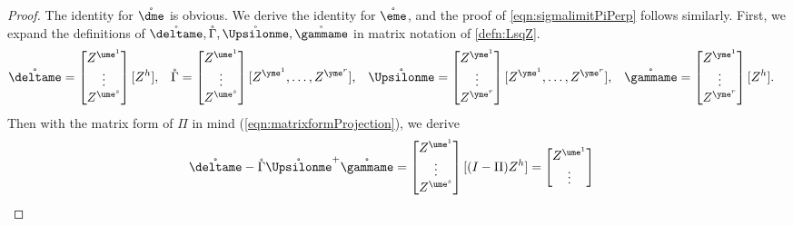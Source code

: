 \documentclass[main.tex]{subfiles}
\begin{document}
  \begin{proof}
    The identity for $\mathring \dme$ is obvious.
    We derive the identity for $\mathring \eme$, and the proof of \cref{eqn:sigmalimitPiPerp} follows similarly.
    First, we expand the definitions of $\mathring \deltame, \mathring\Gamma, \mathring\Upsilonme, \mathring\gammame$ in matrix notation of \cref{defn:LsqZ}.
    \begin{align*}
      \mathring \deltame &= \begin{bmatrix}
              Z^{\ume^1}\\
            \vdots\\
              Z^{\ume^s}
          \end{bmatrix}
          [Z^h]
          ,&
      \mathring \Gamma &=
          \begin{bmatrix}
              Z^{\ume^1}\\
            \vdots\\
              Z^{\ume^s}
          \end{bmatrix}
          [Z^{\yme^1}, \ldots, Z^{\yme^r}]
          ,&
      \mathring \Upsilonme &=
        \begin{bmatrix}
            Z^{\yme^1}\\
          \vdots\\
            Z^{\yme^r}
        \end{bmatrix}
        [Z^{\yme^1}, \ldots, Z^{\yme^r}]
        ,&
      \mathring \gammame &=
        \begin{bmatrix}
            Z^{\yme^1}\\
          \vdots\\
            Z^{\yme^r}
        \end{bmatrix}
        [Z^h]
        .
    \end{align*}
    Then with the matrix form of $\Pi$ in mind (\cref{eqn:matrixformProjection}), we derive
    \begin{align}
    \mathring{\deltame} - \mathring \Gamma \mathring{\Upsilonme }^+ \mathring{\gammame}
      &=
        \begin{bmatrix}
           Z^{\ume^1}\\
          \vdots\\
           Z^{\ume^s}
        \end{bmatrix}
        [(I - \Pi)  Z^{h}]
      =
        \begin{bmatrix}
           Z^{\ume^1}\\
          \vdots\\

\end{bmatrix}
\end{align}
\end{proof}
\end{document}
